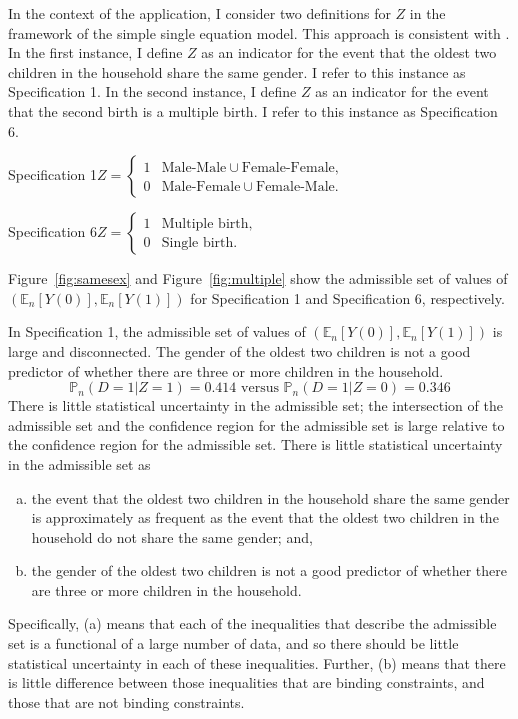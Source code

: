 \documentclass[12pt,a4paper,twoside]{article}
\numberwithin{equation}{section}
\begin{document}
In the context of the application, I consider two definitions for $Z$ in the framework of the simple single equation model. This approach is consistent with \cite{cr13}. In the first instance, I define $Z$ as an indicator for the event that the oldest two children in the household share the same gender. I refer to this instance as Specification 1. In the second instance, I define $Z$ as an indicator for the event that the second birth is a multiple birth. I refer to this instance as Specification 6.
 
\noindent Specification 1\hspace{10pt}$Z=\begin{cases}
1 &\text{Male-Male}\cup\text{Female-Female},\\
0 &\text{Male-Female}\cup\text{Female-Male}.
\end{cases}$

\noindent Specification 6\hspace{10pt}$Z=\begin{cases}
1 &\text{Multiple birth},\\
0 &\text{Single birth}.
\end{cases}$

\noindent Figure~\ref{fig:samesex} and Figure~\ref{fig:multiple} show the admissible set of values of $(\mathbb{E}_n[Y(0)],\mathbb{E}_n[Y(1)])$ for Specification 1 and Specification 6, respectively. 

In Specification 1, the admissible set of values of $(\mathbb{E}_n[Y(0)],\mathbb{E}_n[Y(1)])$ is large and disconnected. The gender of the oldest two children is not a good predictor of whether there are three or more children in the household. 
\[\mathbb{P}_n(D=1|Z=1)=0.414\text{ versus }\mathbb{P}_n(D=1|Z=0)=0.346\]
There is little statistical uncertainty in the admissible set; the intersection of the admissible set and the confidence region for the admissible set is large relative to the confidence region for the admissible set. There is little statistical uncertainty in the admissible set as
\begin{enumerate}[(a)]
\item the event that the oldest two children in the household share the same gender is approximately as frequent as the event that the oldest two children in the household do not share the same gender; and,
\item the gender of the oldest two children is not a good predictor of whether there are three or more children in the household.
\end{enumerate} 
Specifically, (a) means that each of the inequalities that describe the admissible set is a functional of a large number of data, and so there should be little statistical uncertainty in each of these inequalities. Further, (b) means that there is little difference between those inequalities that are binding constraints, and those that are not binding constraints. 
\end{document}
